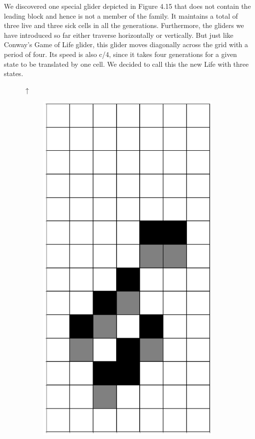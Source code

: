 \documentclass[12pt]{article}
\numberwithin{figure}{section} %
\begin{document}
We discovered one special glider depicted in Figure 4.15 that does not contain the leading block and hence is not a member of the family. It maintains a total of three live and three sick cells in all the generations. Furthermore, the gliders we have introduced so far either traverse horizontally or vertically. But just like Conway’s Game of Life glider, this glider moves diagonally across the grid with a period of four. Its speed is also c/4, since it takes four generations for a given state to be translated by one cell. We decided to call this the new Life with three states.
\begin{figure}[H]
\begin{center}
{\Huge$\uparrow$}
\end{center}
 \begin{subfigure}{0.19\textwidth}
     \centering
     \includegraphics[width=\linewidth]{Section4/15.0}

\end{subfigure}
\end{figure}
\end{document}
